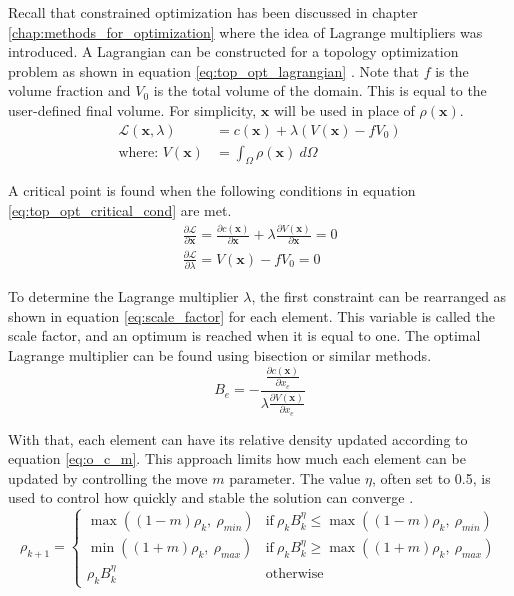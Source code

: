 Recall that constrained optimization has been discussed in chapter \ref{chap:methods_for_optimization} where the idea of Lagrange multipliers was introduced. A Lagrangian can be constructed for a topology optimization problem as shown in equation \ref{eq:top_opt_lagrangian} \cite{Bendsøe_2004}. Note that $f$ is the volume fraction and $V_0$ is the total volume of the domain. This is equal to the user-defined final volume. For simplicity, $\mathbf{x}$ will be used in place of $\rho(\mathbf{x})$.
\begin{equation}
    \begin{split}
        \mathcal{L}(\mathbf{x},\lambda) &= c(\mathbf{x}) + \lambda(V(\mathbf{x}) - fV_0) \\
        \text{where: } V(\mathbf{x}) &= \int_\Omega\rho(\mathbf{x}) \ d\Omega
    \end{split}
    \label{eq:top_opt_lagrangian}
\end{equation}

A critical point is found when the following conditions in equation \ref{eq:top_opt_critical_cond} are met.
\begin{equation}
    \begin{split}
        \frac{\partial \mathcal{L}}{\partial \mathbf{x}} = \frac{\partial c(\mathbf{x})}{\partial \mathbf{x}} + \lambda\frac{\partial V(\mathbf{x})}{\partial \mathbf{x}} = 0\\
        \frac{\partial \mathcal{L}}{\partial \lambda} = V(\mathbf{x}) - fV_0 = 0
    \end{split}
    \label{eq:top_opt_critical_cond}
\end{equation}

To determine the Lagrange multiplier $\lambda$, the first constraint can be rearranged as shown in equation \ref{eq:scale_factor} for each element. This variable is called the scale factor, and an optimum is reached when it is equal to one. The optimal Lagrange multiplier can be found using bisection or similar methods.
\begin{equation}
    B_e = -\frac{\frac{\partial c(\mathbf{x})}{\partial x_e}}{\lambda\frac{\partial V(\mathbf{x})}{\partial x_e}}
    \label{eq:scale_factor}
\end{equation}

With that, each element can have its relative density updated according to equation \ref{eq:o_c_m}. This approach limits how much each element can be updated by controlling the move $m$ parameter. The value $\eta$, often set to 0.5, is used to control how quickly and stable the solution can converge \cite{Bendsøe_2004}. 
\begin{equation}
    \rho_{k+1} = \begin{cases}
        \max{((1 - m)\rho_k, \ \rho_{min})} & \text{if} \ \rho_kB_k^\eta \leq \max{((1 - m)\rho_k, \ \rho_{min})} \\
        \min{((1 + m)\rho_k, \ \rho_{max})} & \text{if} \ \rho_kB_k^\eta \geq \max{((1 + m)\rho_k, \ \rho_{max})} \\
        \rho_kB_k^\eta & \text{otherwise}
    \end{cases}
    \label{eq:o_c_m}
\end{equation}

